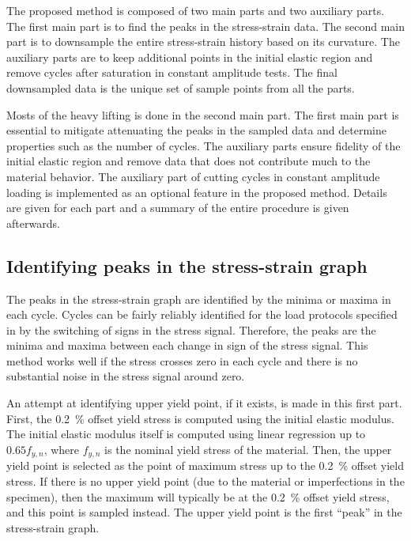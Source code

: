 \documentclass[a4paper,11pt]{article}
\begin{document}
The proposed method is composed of two main parts and two auxiliary parts.
The first main part is to find the peaks in the stress-strain data.
The second main part is to downsample the entire stress-strain history based on its curvature.
The auxiliary parts are to keep additional points in the initial elastic region and remove cycles after saturation in constant amplitude tests.
The final downsampled data is the unique set of sample points from all the parts.

Mosts of the heavy lifting is done in the second main part.
The first main part is essential to mitigate attenuating the peaks in the sampled data and determine properties such as the number of cycles.
The auxiliary parts ensure fidelity of the initial elastic region and remove data that does not contribute much to the material behavior.
The auxiliary part of cutting cycles in constant amplitude loading is implemented as an optional feature in the proposed method.
Details are given for each part and a summary of the entire procedure is given afterwards.

\subsection{Identifying peaks in the stress-strain graph}

The peaks in the stress-strain graph are identified by the minima or maxima in each cycle.
Cycles can be fairly reliably identified for the load protocols specified in \citet{deCastroeSousaConsistencySolvingInverse2020} by the switching of signs in the stress signal.
Therefore, the peaks are the minima and maxima between each change in sign of the stress signal.
This method works well if the stress crosses zero in each cycle and there is no substantial noise in the stress signal around zero.

An attempt at identifying upper yield point, if it exists, is made in this first part.
First, the 0.2~\% offset yield stress is computed using the initial elastic modulus.
The initial elastic modulus itself is computed using linear regression up to $0.65 f_{y,n}$, where $f_{y,n}$ is the nominal yield stress of the material.
Then, the upper yield point is selected as the point of maximum stress up to the 0.2~\% offset yield stress.
If there is no upper yield point (due to the material or imperfections in the specimen), then the maximum will typically be at the 0.2~\% offset yield stress, and this point is sampled instead.
The upper yield point is the first ``peak'' in the stress-strain graph.
\end{document}
